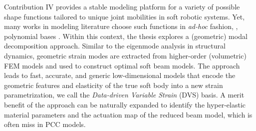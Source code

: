 \vspace{-5mm}
Contribution IV provides a stable modeling platform for a variety of possible shape functions tailored to unique joint mobilities in soft robotic systems. Yet, many works in modeling literature choose such functions in \textit{ad-hoc} fashion, \eg, polynomial bases \cite{DellaSantina2020,Boyer2021,Chirikjian1991}. Within this context, the thesis explores a (geometric) modal decomposition approach. Similar to the eigenmode analysis in structural dynamics, geometric strain modes are extracted from higher-order (volumetric) FEM models and used to construct optimal soft beam models. The approach leads to fast, accurate, and generic low-dimensional models that encode the geometric features and elasticity of the true soft body into a new strain parametrization,  we call the \textit{Data-driven Variable Strain} (DVS) basis. A merit benefit of the approach can be naturally expanded to identify the hyper-elastic material parameters and the actuation map of the reduced beam model, which is often miss in PCC models. %
 


